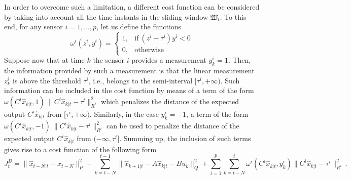 \documentclass[11pt,journal,onecolumn]{IEEEtran}
\begin{document}
In order to overcome such a limitation, a different cost function can be considered by taking into account all the time instants in the sliding window $\mathfrak W_t$. To this end, for any sensor $i = 1 , \ldots, p$, let us define the functions
\begin{equation}
\omega^i(z^{i},y^i)= \left\{ \begin{array}{ll}
1, & \mbox{if} ~ \left( z^i - \tau^i \right) y^i < 0 \\
0, & \mbox{otherwise}
\end{array} \right.
\end{equation}
Suppose now that at time $k$ the sensor $i$ provides a measurement $y^i_k = 1$. Then, the information provided by such a measurement is that the linear measurement $z^i_k$ is above the threshold $\tau^i$, i.e., belongs to the semi-interval $[\tau^i, +\infty)$. Such information can be included in the cost function by means of a term of the form $\omega(C^{i}\hat{x}_{k|t},1)~\|C^{i}\hat{x}_{k|t}-\tau^{i}\|^{2}_{R^{i}}$ which penalizes the distance of the expected output $C^{i}\hat{x}_{k|t}$ from $[\tau^i, +\infty)$. Similarly, in the case $y^i_k = -1$, a term of the form $\omega(C^{i}\hat{x}_{k|t},-1)~\|C^{i}\hat{x}_{k|t}-\tau^{i}\|^{2}_{R^{i}}$ can be used to penalize the distance of the expected output $C^{i}\hat{x}_{k|t}$ from $(-\infty,\tau^i]$. Summing up, the inclusion of such terms gives rise to a cost function of the following form
\begin{equation}\label{36}
J^B_{t} = \|\hat{x}_{t-N|t}-\overline{x}_{t-N}\|^{2}_{P}  + \sum_{k=t-N}^{t-1}\|\hat{x}_{k+1|t}-A\hat{x}_{k|t}-B u_{k}\|^{2}_{Q}
+ \sum_{i=1}^{p}\sum_{k=t-N}^{t} \omega^i (C^{i}\hat{x}_{k|t},y_{k}^{i}) \| C^{i}\hat{x}_{k|t}-\tau^{i}\|^{2}_{R^{i}} \, .
\end{equation}
\end{document}
